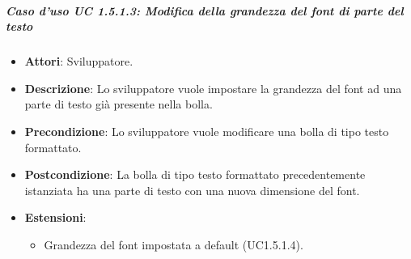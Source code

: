 \subparagraph{Caso d'uso UC 1.5.1.3: Modifica della grandezza del font di parte del testo}


\FloatBarrier
\begin{itemize}
\item\textbf{Attori}: Sviluppatore.
\item\textbf{Descrizione}: Lo sviluppatore vuole impostare la grandezza del font ad una parte di testo già presente nella bolla.
\item\textbf{Precondizione}: Lo sviluppatore vuole modificare una bolla di tipo testo formattato.
\item\textbf{Postcondizione}: La bolla di tipo testo formattato precedentemente istanziata ha una parte di testo con una nuova dimensione del font.
\item\textbf{Estensioni}: 
\begin{itemize}

\item Grandezza del font impostata a default (UC1.5.1.4).

\end{itemize}

\end{itemize}

